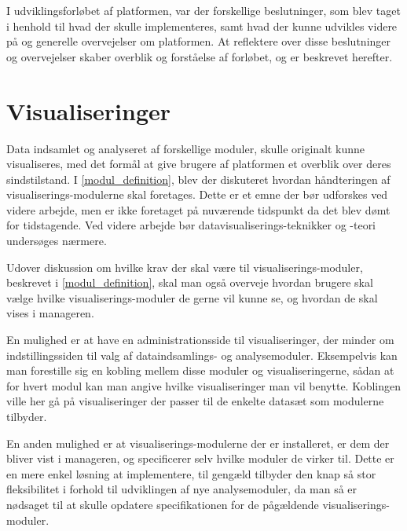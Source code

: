 I udviklingsforløbet af platformen, var der forskellige beslutninger, som blev taget i henhold til hvad der skulle implementeres, samt hvad der kunne udvikles videre på og generelle overvejelser om platformen.
At reflektere over disse beslutninger og overvejelser skaber overblik og forståelse af forløbet, og er beskrevet herefter.


\section{Visualiseringer}
Data indsamlet og analyseret af forskellige moduler, skulle originalt kunne visualiseres, med det formål at give brugere af platformen et overblik over deres sindstilstand.
I \cref{modul_definition}, blev der diskuteret hvordan håndteringen af visualiserings-modulerne skal foretages.
Dette er et emne der bør udforskes ved videre arbejde, men er ikke foretaget på nuværende tidspunkt da det blev dømt for tidstagende.
Ved videre arbejde bør datavisualiserings-teknikker og -teori undersøges nærmere.

Udover diskussion om hvilke krav der skal være til visualiserings-moduler, beskrevet i \cref{modul_definition}, skal man også overveje hvordan brugere skal vælge hvilke visualiserings-moduler de gerne vil kunne se, og hvordan de skal vises i manageren.

En mulighed er at have en administrationsside til visualiseringer, der minder om indstillingssiden til valg af dataindsamlings- og analysemoduler.
Eksempelvis kan man forestille sig en kobling mellem disse moduler og visualiseringerne, sådan at for hvert modul kan man angive hvilke visualiseringer man vil benytte.
Koblingen ville her gå på visualiseringer der passer til de enkelte datasæt som modulerne tilbyder.

En anden mulighed er at visualiserings-modulerne der er installeret, er dem der bliver vist i manageren, og specificerer selv hvilke moduler de virker til.
Dette er en mere enkel løsning at implementere, til gengæld tilbyder den knap så stor fleksibilitet i forhold til udviklingen af nye analysemoduler, da man så er nødsaget til at skulle opdatere specifikationen for de pågældende visualiserings-moduler.

